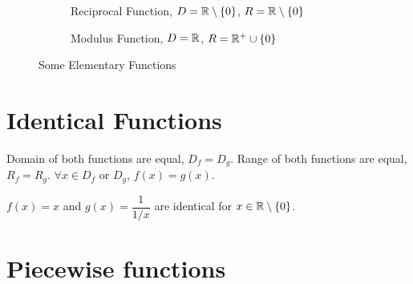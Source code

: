 \begin{figure}[H]
    \begin{subfigure}{.5\textwidth}
        \centering
    \caption{Reciprocal Function, \(D = \mathbb R \setminus \left\{0\right\}\), \(R = \mathbb R \setminus \left\{0\right\}\) } 
    \end{subfigure}%
    \begin{subfigure}{.5\textwidth}
        \centering
    \caption{Modulus Function, \(D = \mathbb R\), \(R = \mathbb R^+ \cup \left\{0\right\}\)}
    \end{subfigure}
\caption{Some Elementary Functions}
\end{figure}

\section{Identical Functions}


\begin{itemize}
    \ii Domain of both functions are equal, \(D_f = D_g\).
    \ii Range of both functions are equal, \(R_f = R_g\).
    \ii \(\forall x \in D_f\) or \(D_g\), \(f(x) = g(x)\).
\end{itemize}

\begin{example}
    \(f(x) = x\) and \(g(x) = \dfrac{1}{1/x}\) are identical for 
    \(x \in \mathbb R \setminus \left\{0\right\}\).
\end{example}

\section{Piecewise functions}

